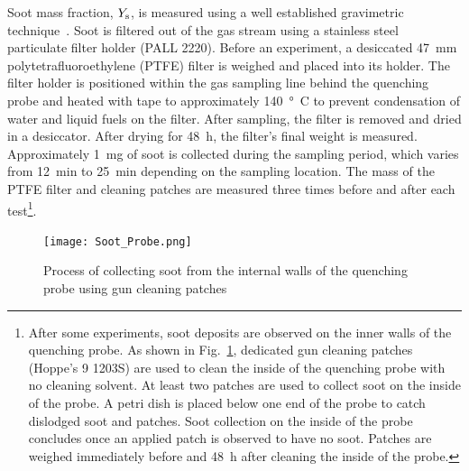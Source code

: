 \documentclass[12pt]{article}
\begin{document}
Soot mass fraction, $Y_{\rm s}$, is measured using a well established gravimetric technique~\cite{Choi1995}. Soot is filtered out of the gas stream using a stainless steel particulate filter holder (PALL 2220).  Before an experiment, a desiccated \SI{47}{mm} polytetrafluoroethylene (PTFE) filter is weighed and placed into its holder. The filter holder is positioned within the gas sampling line behind the quenching probe and heated with tape to approximately \SI{140}{\degree C} to prevent condensation of water and liquid fuels on the filter. After sampling, the filter is removed and dried in a desiccator. After drying for 48~h, the filter’s final weight is measured. Approximately \SI{1}{mg} of soot is collected during the sampling period, which varies from 12~min to 25~min depending on the sampling location. The mass of the PTFE filter and cleaning patches are measured three times before and after each test\footnote{After some experiments, soot deposits are observed on the inner walls of the quenching probe. As shown in Fig.~\ref{fig:Soot_Probe_Setup}, dedicated gun cleaning patches (Hoppe's 9 1203S) are used to clean the inside of the quenching probe with no cleaning solvent. At least two patches are used to collect soot on the inside of the probe. A petri dish is placed below one end of the probe to catch dislodged soot and patches. Soot collection on the inside of the probe concludes once an applied patch is observed to have no soot. Patches are weighed immediately before and 48~h after cleaning the inside of the probe.}.

\begin{figure}[ht!]
	\centering
\texttt{[image: Soot\_Probe.png]}
	\caption[Process for cleaning soot probe]{Process of collecting soot from the internal walls of the quenching probe using gun cleaning patches}
	\label{fig:Soot_Probe_Setup}
\end{figure}
\end{document}
